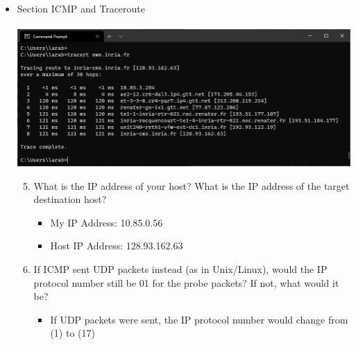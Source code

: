 \documentclass[11pt]{article}
\begin{document}
\begin{enumerate}[label=(\alph*)]
\begin{itemize}
        
        \item Section ICMP and Traceroute \\ \\
        \includegraphics[width=1\textwidth]{HW1Template/trace_cmd.PNG}
        \begin{enumerate}[label=(\arabic*)]
        \setcounter{enumii}{4}
            \item What is the IP address of your host? What is the IP address of the target destination host?
                \begin{itemize}
                    \item My IP Address: 10.85.0.56
                    \item Host IP Address: 128.93.162.63
                \end{itemize}
                
                
            \item If ICMP sent UDP packets instead (as in Unix/Linux), would the IP protocol number still be 01 for the probe packets? If not, what would it be? 
                \begin{itemize}
                    \item If UDP packets were sent, the IP protocol number would change from (1) to (17)
                \end{itemize}
                

\end{enumerate}
\end{itemize}
\end{enumerate}
\end{document}
